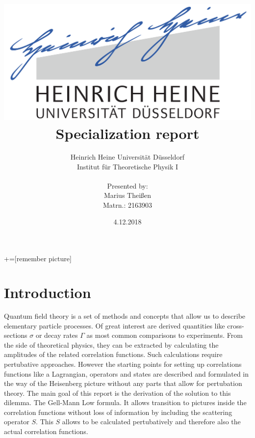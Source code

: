 \documentclass[12pt, titlepage]{article}
\title{\includegraphics[scale=0.07]{logo}\\Specialization report}
\date{4.12.2018}
\author{ Heinrich Heine Universit\"at D\"usseldorf\\ Institut f\"ur Theoretische Physik I\\  \\Presented by:\\Marius Thei\ss{}en\\ Matrn.: 2163903 \\  }
\begin{document}
+=[remember picture]
\everymath{\displaystyle}

\maketitle %
\tableofcontents
\newpage
\section{Introduction}\label{Introduction}
Quantum field theory is a set of methods and concepts that allow us to describe elementary particle processes. Of great interest are derived quantities like cross-sections $ \sigma  $ or decay rates $ \Gamma $ as most common comparisons to experiments. From the side of theoretical physics, they can be extracted by calculating the amplitudes of the related correlation functions. Such calculations require pertubative approaches. However the starting points for setting up correlations functions like a Lagrangian, operators and states are described and formulated in the way of the Heisenberg picture without any parts that allow for pertubation theory. The main goal of this report is the derivation of the solution to this dilemma. The Gell-Mann Low formula. It allows transition to pictures inside the correlation functions without loss of information by including the scattering operator $ S $. This $ S $ allows to be calculated pertubatively and therefore also the actual correlation functions.  
\end{document}
